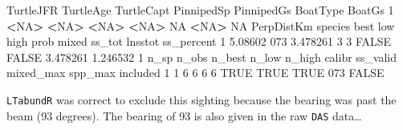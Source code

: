 \documentclass[
]{book}
\newenvironment{Shaded}{\begin{snugshade}}{\end{snugshade}}
\newcommand{\ConstantTok}[1]{\textcolor[rgb]{0.56,0.35,0.01}{#1}}
\newcommand{\DecValTok}[1]{\textcolor[rgb]{0.00,0.00,0.81}{#1}}
\newcommand{\ErrorTok}[1]{\textcolor[rgb]{0.64,0.00,0.00}{\textbf{#1}}}
\newcommand{\FloatTok}[1]{\textcolor[rgb]{0.00,0.00,0.81}{#1}}
\newcommand{\FunctionTok}[1]{\textcolor[rgb]{0.13,0.29,0.53}{\textbf{#1}}}
\newcommand{\NormalTok}[1]{#1}
\newcommand{\OtherTok}[1]{\textcolor[rgb]{0.56,0.35,0.01}{#1}}
\newcommand{\SpecialCharTok}[1]{\textcolor[rgb]{0.81,0.36,0.00}{\textbf{#1}}}
\newcommand{\StringTok}[1]{\textcolor[rgb]{0.31,0.60,0.02}{#1}}
\begin{document}
\begin{Shaded}
\begin{Highlighting}[]
\NormalTok{  TurtleJFR TurtleAge TurtleCapt PinnipedSp PinnipedGs BoatType BoatGs}
\DecValTok{1}      \SpecialCharTok{\textless{}}\ConstantTok{NA}\SpecialCharTok{\textgreater{}}      \ErrorTok{\textless{}}\ConstantTok{NA}\SpecialCharTok{\textgreater{}}       \ErrorTok{\textless{}}\ConstantTok{NA}\SpecialCharTok{\textgreater{}}       \ErrorTok{\textless{}}\ConstantTok{NA}\SpecialCharTok{\textgreater{}}         \ConstantTok{NA}     \SpecialCharTok{\textless{}}\ConstantTok{NA}\SpecialCharTok{\textgreater{}}     \ConstantTok{NA}
\NormalTok{  PerpDistKm species     best low high  prob mixed   ss\_tot  lnsstot ss\_percent}
\DecValTok{1}    \FloatTok{5.08602}     \DecValTok{073} \FloatTok{3.478261}   \DecValTok{3}    \DecValTok{3} \ConstantTok{FALSE} \ConstantTok{FALSE} \FloatTok{3.478261} \FloatTok{1.246532}          \DecValTok{1}
\NormalTok{  n\_sp n\_obs n\_best n\_low n\_high calibr ss\_valid mixed\_max spp\_max included}
\DecValTok{1}    \DecValTok{1}     \DecValTok{6}      \DecValTok{6}     \DecValTok{6}      \DecValTok{6}   \ConstantTok{TRUE}     \ConstantTok{TRUE}      \ConstantTok{TRUE}     \DecValTok{073}    \ConstantTok{FALSE}
\end{Highlighting}
\end{Shaded}

\texttt{LTabundR} was correct to exclude this sighting because the bearing was past the beam (93 degrees). The bearing of 93 is also given in the raw \texttt{DAS} data\ldots{}

\begin{Shaded}
\end{Shaded}
\end{document}
